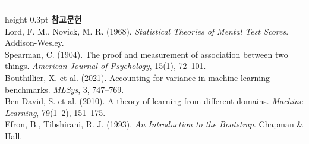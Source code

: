 \documentclass[10pt]{article}
\begin{document}
\vspace{0.6em}
\hrule height 0.3pt
\vspace{0.5em}
{\footnotesize
\textbf{참고문헌}\\[0.3em]
Lord, F. M., Novick, M. R. (1968). \emph{Statistical Theories of Mental Test
Scores}. Addison-Wesley.\\[0.15em]
Spearman, C. (1904). The proof and measurement of association between two things.
\emph{American Journal of Psychology}, 15(1), 72--101.\\[0.15em]
Bouthillier, X. et al. (2021). Accounting for variance in machine learning
benchmarks. \emph{MLSys}, 3, 747--769.\\[0.15em]
Ben-David, S. et al. (2010). A theory of learning from different domains.
\emph{Machine Learning}, 79(1--2), 151--175.\\[0.15em]
Efron, B., Tibshirani, R. J. (1993). \emph{An Introduction to the Bootstrap}.
Chapman \& Hall.
}
\end{document}
